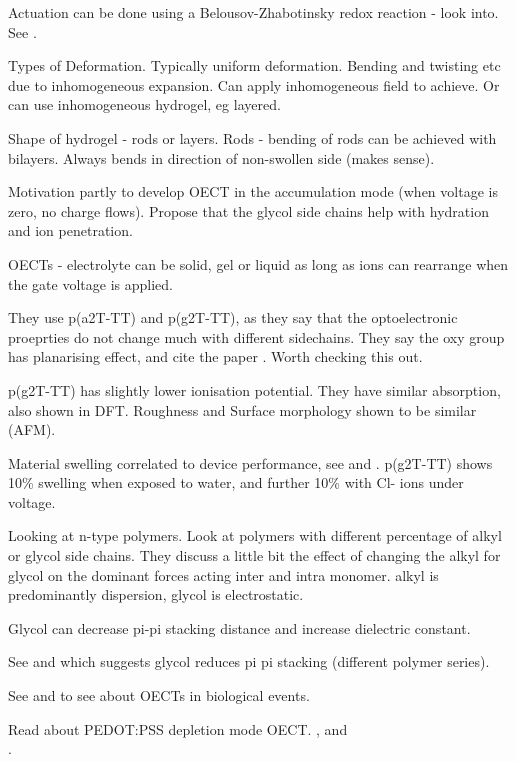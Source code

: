 \documentclass{article}
\begin{document}
Actuation can be done using a Belousov-Zhabotinsky redox reaction - look into.  See \cite{Suzuki2012,Maeda2010}.  

Types of Deformation.  Typically uniform deformation. Bending and twisting etc due to inhomogeneous expansion.  Can apply inhomogeneous field to achieve.  Or can use inhomogeneous hydrogel, eg layered. 

Shape of hydrogel - rods or layers.  Rods - bending of rods can be achieved with bilayers. Always bends in direction of non-swollen side (makes sense).
 
 \vspace{1cm}
{\bf \cite{Giovannitti2016}}

Motivation partly to develop OECT in the accumulation mode (when voltage is zero, no charge flows). Propose that the glycol side chains help with hydration and ion penetration.  

OECTs - electrolyte can be solid, gel or liquid as long as ions can rearrange when the gate voltage is applied.   

They use p(a2T-TT) and p(g2T-TT), as they say that the optoelectronic proeprties do not change much with different sidechains.  They say the oxy group has planarising effect, and cite the paper \cite{Guo2013}.  Worth checking this out. 

p(g2T-TT) has slightly lower ionisation potential.  They have similar absorption, also shown in DFT. Roughness and Surface morphology shown to be similar (AFM).  

Material swelling correlated to device performance, see \cite{Inal2016} and \cite{Stavrinidou2013}.  p(g2T-TT) shows 10\% swelling when exposed to water, and further 10\% with Cl- ions under voltage. 

 \vspace{1cm}
{\bf \cite{Giovannitti2018}}

Looking at n-type polymers.  Look at polymers with different percentage of alkyl or glycol side chains.   They discuss a little bit the effect of changing the alkyl for glycol on the dominant forces acting inter and intra monomer. alkyl is predominantly dispersion,  glycol is electrostatic.

Glycol can decrease pi-pi stacking distance and increase dielectric constant. 

See \cite{Chen2016} and \cite{Meng2015} which suggests glycol reduces pi pi stacking (different polymer series).  

See \cite{Strakosas2015} and \cite{Rivnay2018} to see about OECTs in biological events.  

Read about PEDOT:PSS depletion mode OECT.  \cite{Khodagholy2013}, \cite{Khodagholy2013a} and \\\cite{Campana2014}.  

















\newpage



  
\end{document}
